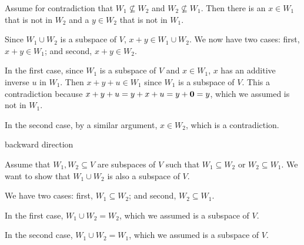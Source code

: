 Assume for contradiction that
$W_1 \not\subseteq W_2$ and $W_2 \not\subseteq W_1$.
Then there is an $x \in W_1$ that is not in $W_2$
and a $y \in W_2$ that is not in $W_1$.

Since $W_1 \cup W_2$ is a subspace of $V$, $x + y \in W_1 \cup W_2$.
We now have two cases: first, $x + y \in W_1$; and second, $x + y \in W_2$.

In the first case, since $W_1$ is a subspace of $V$
and $x \in W_1$, $x$ has an additive inverse $u$ in $W_1$.
Then $x + y + u \in W_1$ since $W_1$ is a subspace of $V$.
This a contradiction because $x + y + u = y + x + u = y + {\bf 0} = y$,
which we assumed is not in $W_1$.

In the second case, by a similar argument, $x \in W_2$,
which is a contradiction.

\item{} backward direction

Assume that $W_1,W_2 \subseteq V$ are subspaces of $V$
such that $W_1 \subseteq W_2$ or $W_2 \subseteq W_1$.
We want to show that $W_1 \cup W_2$ is also a subspace of $V$.

We have two cases: first, $W_1 \subseteq W_2$;
and second, $W_2 \subseteq W_1$.

In the first case, $W_1 \cup W_2 = W_2$,
which we assumed is a subspace of $V$.

In the second case, $W_1 \cup W_2 = W_1$,
which we assumed is a subspace of $V$.
\bye
